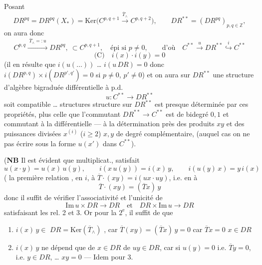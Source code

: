 \documentclass[11pt,a4paper]{article}
\begin{document}
Posant
\[
  DR^{pq} = DR^{pq}(X_*) = \mathrm{Ker}\bigl(C^{p,q+1} \xrightarrow{\overline{T}_\wedge} C^{p,q+2}\bigr),
  \qquad
  DR^{**} = (DR^{pq})_{p,q \in \mathbb{Z}},
\]
on aura donc
\[
  C^{p,q} \xrightarrow{\;\overline{T}_\wedge =: u\;} DR^{pq}, \ \subset C^{p,q+1},
  \quad \text{épi si } p \neq 0,
  \qquad \text{d'où} \quad
  C^{**} \xrightarrow{\;u\;} DR^{**} \overset{i}{\hookrightarrow} C^{**}
\]
\[
  \text{(C)} \quad i(x) \cdot i(y) = 0
\]
(il en résulte que $i(u(\ldots))$ \ldots{} $i(u\, DR) = 0$ donc $i(DR^{p,q}) \times i(DR^{p',q'}) = 0$
si $p \neq 0$, $p' \neq 0$)
et on aura sur $DR^{**}$ une structure d'algèbre bigraduée différentielle à p.d.
\[
  u : C^{**} \longrightarrow DR^{**}
\]
soit compatible \ldots{}   structures
 structure sur $DR^{**}$ est presque déterminée par ces propriétés, plus
celle que l'commutant $DR^{**} \to C^{**}$ est de bidegré $0, 1$ et commutant à
la différentielle --- à la détermination près des produits $xy$ \add{\ill{}} et des
puissances divisées $x^{(i)}$ ($i \geq 2$)  $x, y$ de degré
complémentaire, (auquel cas on ne  \ill{} pas 
 écrire sous la forme $u(x')$   dans $C^{**}$).
 \struck{\ill{}} 
\struck{\ill{}}

(\textbf{NB} Il est évident que  \struck{\ill{}}   multiplicat., \ill{} satisfait
\[
  u(x \cdot y) = u(x)\, u(y), \qquad i(x\, u(y)) = i(x)\, y, \qquad i(u(y)\, x) = y\, i(x)
\]
(\struck{\ill{}} la première relation , en  $i$,
à $\overline{T} \cdot (xy) = i(u x \cdot u y)$, i.e. en  à
\[
  \overline{T} \cdot (xy) = (\overline{T} x)\, y
\]
donc il suffit de vérifier l'associativité et l'unicité de
\[
  \mathrm{Im}\, u \times DR \to DR \quad \text{et} \quad DR \times \mathrm{Im}\, u \to DR
\]
satisfaisant les rel. 2 et 3. Or pour la $2^{\text{e}}$, il suffit de
 que
\begin{enumerate}
  \item[a)] $i(x)\, y \in$  $DR = \mathrm{Ker}(\overline{T}_\wedge)$
  , car $\overline{T}(xy) = (\overline{T} x)\, y = 0$ car $\overline{T} x = 0$
   $x \in DR$
  \item[b)] $i(x)\, y$  ne dépend que de $x \in DR$  de
  $u y \in DR$, car si $u(y) = 0$ i.e. $\overline{T} y = 0$, i.e. $y \in DR$, \ldots{}
  $xy = 0$ --- Idem pour 3.
\end{enumerate}
\end{document}
